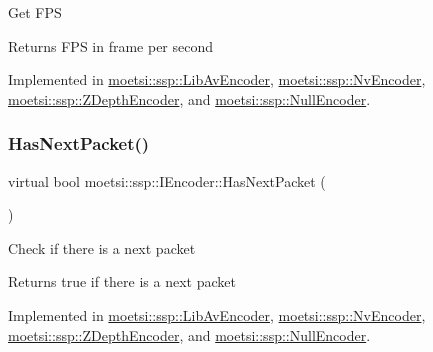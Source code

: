Get F\+PS \begin{DoxyReturn}{Returns}
F\+PS in frame per second 
\end{DoxyReturn}


Implemented in \hyperlink{classmoetsi_1_1ssp_1_1LibAvEncoder_ae21f81cb967359132183a29e04307933}{moetsi\+::ssp\+::\+Lib\+Av\+Encoder}, \hyperlink{classmoetsi_1_1ssp_1_1NvEncoder_ab94b826f2aef05afad376132743001d9}{moetsi\+::ssp\+::\+Nv\+Encoder}, \hyperlink{classmoetsi_1_1ssp_1_1ZDepthEncoder_a9ea0a5783d7d265fccc3a2c262600552}{moetsi\+::ssp\+::\+Z\+Depth\+Encoder}, and \hyperlink{classmoetsi_1_1ssp_1_1NullEncoder_ad6727fa08528622081aa4eca4aacc6c1}{moetsi\+::ssp\+::\+Null\+Encoder}.

\mbox{\label{classmoetsi_1_1ssp_1_1IEncoder_a2af8e23d841ef61f6ee4037e56a3694d}} 
\subsubsection{\texorpdfstring{Has\+Next\+Packet()}{HasNextPacket()}\hspace{0.1cm}{\footnotesize\ttfamily [1/2]}}
{\footnotesize\ttfamily virtual bool moetsi\+::ssp\+::\+I\+Encoder\+::\+Has\+Next\+Packet (\begin{DoxyParamCaption}{ }\end{DoxyParamCaption})\hspace{0.3cm}{\ttfamily [pure virtual]}}

Check if there is a next packet \begin{DoxyReturn}{Returns}
true if there is a next packet 
\end{DoxyReturn}


Implemented in \hyperlink{classmoetsi_1_1ssp_1_1LibAvEncoder_a306c0935fa37bd35ddfeb8290289e927}{moetsi\+::ssp\+::\+Lib\+Av\+Encoder}, \hyperlink{classmoetsi_1_1ssp_1_1NvEncoder_a4c0874d9d0d767ae7a33fe9c9a1be1de}{moetsi\+::ssp\+::\+Nv\+Encoder}, \hyperlink{classmoetsi_1_1ssp_1_1ZDepthEncoder_ac11aa1369150c2aa5ffa1d70d4e6ad5d}{moetsi\+::ssp\+::\+Z\+Depth\+Encoder}, and \hyperlink{classmoetsi_1_1ssp_1_1NullEncoder_a359eb668c16a1ef7963214f7f6303af4}{moetsi\+::ssp\+::\+Null\+Encoder}.

\mbox{\label{classmoetsi_1_1ssp_1_1IEncoder_a2af8e23d841ef61f6ee4037e56a3694d}} 
